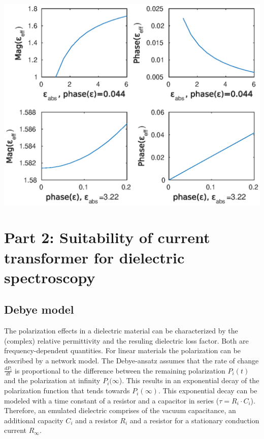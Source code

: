 \begin{center}
	\includegraphics[width=\textwidth]{figures/Theory/layeredepsilon.eps}
	\end{center}
	
	
	
\section{Part 2:  Suitability of current transformer for dielectric spectroscopy}


\subsection{Debye model}
The polarization effects in a dielectric material can be characterized by the (complex) relative permittivity and the resuling dielectric loss factor. Both are frequency-dependent quantities. 
For linear materials the polarization can be described by a network model. The Debye-ansatz assumes that the rate of change $ \frac{dP_i}{dt}$ is proportional to the difference between the remaining polarization $P_i(t)$ and the polarization at infinity $P_i(\infty$). This results in an exponential decay of the polarization function that tends towards $P_i(\infty)$. This exponential decay can be modeled with a time constant of a resistor and a capacitor in series ($\tau=R_i \cdot C_i$). Therefore, an emulated dielectric comprises of the vacuum capacitance, an additional capacity $C_i$ and a resistor $R_i$ and a resistor for a stationary conduction current $R_{\infty}$. 

